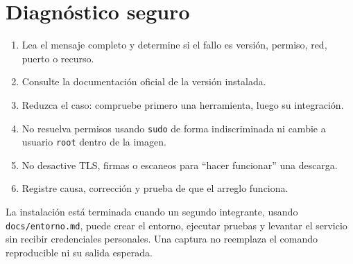 \section{Diagnóstico seguro}

\begin{enumerate}
  \item Lea el mensaje completo y determine si el fallo es versión, permiso, red, puerto o recurso.
  \item Consulte la documentación oficial de la versión instalada.
  \item Reduzca el caso: compruebe primero una herramienta, luego su integración.
  \item No resuelva permisos usando \texttt{sudo} de forma indiscriminada ni cambie a usuario \texttt{root} dentro de la imagen.
  \item No desactive TLS, firmas o escaneos para ``hacer funcionar'' una descarga.
  \item Registre causa, corrección y prueba de que el arreglo funciona.
\end{enumerate}

\begin{validacion}
La instalación está terminada cuando un segundo integrante, usando \texttt{docs/entorno.md}, puede crear el entorno, ejecutar pruebas y levantar el servicio sin recibir credenciales personales. Una captura no reemplaza el comando reproducible ni su salida esperada.
\end{validacion}
